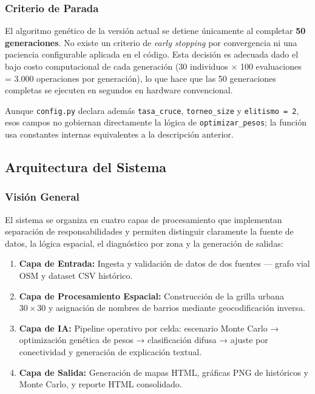 \documentclass[11pt]{article}
\begin{document}
\subsubsection{Criterio de Parada}

El algoritmo genético de la versión actual se detiene únicamente al completar \textbf{50 generaciones}. No existe un criterio de \textit{early stopping} por convergencia ni una paciencia configurable aplicada en el código. Esta decisión es adecuada dado el bajo costo computacional de cada generación (30 individuos $\times$ 100 evaluaciones = 3.000 operaciones por generación), lo que hace que las 50 generaciones completas se ejecuten en segundos en hardware convencional.

\noindent Aunque \texttt{config.py} declara además \texttt{tasa\_cruce}, \texttt{torneo\_size} y \texttt{elitismo = 2}, esos campos no gobiernan directamente la lógica de \texttt{optimizar\_pesos}; la función usa constantes internas equivalentes a la descripción anterior.

\subsection{Arquitectura del Sistema}

\subsubsection{Visión General}

El sistema se organiza en cuatro capas de procesamiento que implementan separación de responsabilidades y permiten distinguir claramente la fuente de datos, la lógica espacial, el diagnóstico por zona y la generación de salidas:

\begin{enumerate}
    \item \textbf{Capa de Entrada:} Ingesta y validación de datos de dos fuentes — grafo vial OSM y dataset CSV histórico.
    \item \textbf{Capa de Procesamiento Espacial:} Construcción de la grilla urbana $30 \times 30$ y asignación de nombres de barrios mediante geocodificación inversa.
    \item \textbf{Capa de IA:} Pipeline operativo por celda: escenario Monte Carlo → optimización genética de pesos → clasificación difusa → ajuste por conectividad y generación de explicación textual.
    \item \textbf{Capa de Salida:} Generación de mapas HTML, gráficas PNG de históricos y Monte Carlo, y reporte HTML consolidado.
\end{enumerate}
\end{document}

